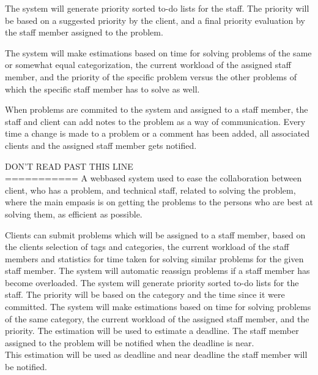 The system will generate priority sorted to-do lists for the staff. The priority will be based on a suggested priority by the client, and a final priority evaluation by the staff member assigned to the problem.

The system will make estimations based on time for solving problems of the same or somewhat equal categorization, the current workload of the assigned staff member, and the priority of the specific problem versus the other problems of which the specific staff member has to solve as well.

When problems are commited to the system and assigned to a staff member, the staff and client can add notes to the problem as a way of communication. Every time a change is made to a problem or a comment has been added, all associated clients and the assigned staff member gets notified.


DON'T READ PAST THIS LINE\\




===========
A webbased system used to ease the collaboration between client, who has a problem, and technical staff, related to solving the problem, where the main empasis is on getting the problems to the persons who are best at solving them, as efficient as possible.
 
Clients can submit problems which will be assigned to a staff member, based on the clients selection of tags and categories, the current workload of the staff members and statistics for time taken for solving similar problems for the given staff member. 
The system will automatic reassign problems if a staff member has become overloaded.
The system will generate priority sorted to-do lists for the staff. The priority will be based on the category and the time since it were committed.
The system will make estimations based on time for solving problems of the same category, the current workload of the assigned staff member, and the priority. The estimation will be used to estimate a deadline. The staff member assigned to the problem will be notified when the deadline is near.\\

This estimation will be used as deadline and near deadline the staff member will be notified.

